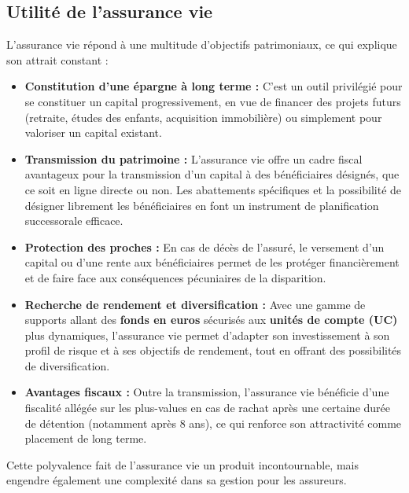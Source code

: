 \subsection{Utilité de l'assurance vie}
\label{subsec:utilite_assurance_vie}
L'assurance vie répond à une multitude d'objectifs patrimoniaux, ce qui explique son attrait constant :
\begin{itemize}
    \item \textbf{Constitution d'une épargne à long terme :} C'est un outil privilégié pour se constituer un capital progressivement, en vue de financer des projets futurs (retraite, études des enfants, acquisition immobilière) ou simplement pour valoriser un capital existant.
    \item \textbf{Transmission du patrimoine :} L'assurance vie offre un cadre fiscal avantageux pour la transmission d'un capital à des bénéficiaires désignés, que ce soit en ligne directe ou non. Les abattements spécifiques et la possibilité de désigner librement les bénéficiaires en font un instrument de planification successorale efficace.
    \item \textbf{Protection des proches :} En cas de décès de l'assuré, le versement d'un capital ou d'une rente aux bénéficiaires permet de les protéger financièrement et de faire face aux conséquences pécuniaires de la disparition.
    \item \textbf{Recherche de rendement et diversification :} Avec une gamme de supports allant des \textbf{fonds en euros} sécurisés aux \textbf{unités de compte (UC)} plus dynamiques, l'assurance vie permet d'adapter son investissement à son profil de risque et à ses objectifs de rendement, tout en offrant des possibilités de diversification.
    \item \textbf{Avantages fiscaux :} Outre la transmission, l'assurance vie bénéficie d'une fiscalité allégée sur les plus-values en cas de rachat après une certaine durée de détention (notamment après 8 ans), ce qui renforce son attractivité comme placement de long terme.
\end{itemize}
Cette polyvalence fait de l'assurance vie un produit incontournable, mais engendre également une complexité dans sa gestion pour les assureurs.

